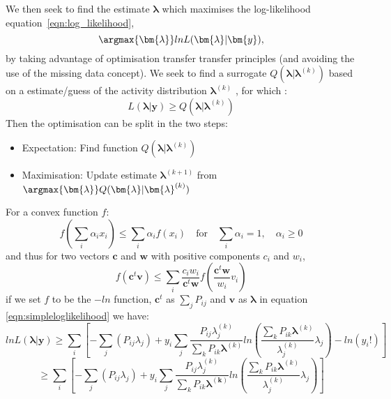 We then seek to find the estimate $\bm{\lambda}$ which maximises the log-likelihood equation~\ref{eqn:log_likelihood},
\begin{equation}
\argmax{\bm{\lambda}}lnL(\bm{\lambda}|\bm{y}) \\, 
\end{equation}
by taking advantage of optimisation transfer transfer principles (and avoiding the use of the missing data concept). We seek to find a surrogate $Q(\bm{\lambda}|\bm{\lambda}^{(k)})$ based on a estimate/guess of the activity distribution $\bm{\lambda}^{(k)}$ , for which : 
\begin{equation}
L(\bm{\lambda}|\bm{y}) \geq Q(\bm{\lambda}|\bm{\lambda}^{(k)}) 
\end{equation}
Then the optimisation can be split in the two steps: 
\begin{itemize}
\item Expectation: Find function $Q(\bm{\lambda}|\bm{\lambda}^{(k)})$ 
\item Maximisation: Update estimate $\bm{\lambda}^{(k+1)}$ from $\argmax{\bm{\lambda}} Q(\bm{\lambda}|\bm{\lambda}^{(k)})$ 
\end{itemize}
For a convex function $f$:
\begin{equation}
f(\sum_i \alpha_i x_i ) \leq \sum_i \alpha_i f(x_i )\quad  \text{for}  \quad \sum_i \alpha_i = 1,\quad  \alpha_i \geq 0
\end{equation}
and thus for two vectors $\bm{c}$ and $\bm{w}$ with positive components $c_i$ and $w_i$, 
\begin{equation}
f(\bm{c}^t \bm{v}) \leq \sum_i \frac{c_iw_i}{\bm{c}^t\bm{w}}f(\frac{\bm{c}^t\bm{w}}{w_i}v_i)
\label{eqn:optimisation_transfer}
\end{equation}
if we set $f$ to be the $-ln$ function, $\bm{c}^t$ as $\sum_j P_{ij} $ and $\bm{v}$ as $\bm{\lambda}$ in equation \ref{eqn:simpleloglikelihood} we have: 
\begin{equation}
    lnL(\bm{\lambda}|\bm{y})  \geq \sum_i \left[  -\sum_j (P_{ij} \lambda_j) + y_i  \sum_j \frac{P_{ij} \lambda^{(k)}_j}{\sum_k P_{ik} \bm{\lambda}^{(k)}} ln(\frac{\sum_k P_{ik} \bm{\lambda}^{(k)}}{\lambda^{(k)}_j} \lambda_j ) - ln({y_i}!) \right]
\end{equation}
\begin{equation}
\geq \sum_i \left[  -\sum_j (P_{ij} \lambda_j) + y_i  \sum_j \frac{P_{ij}\lambda^{(k)}_j}{\sum_k P_{ik} \bm{\lambda^{(k)}}} ln(\frac{\sum_k P_{ik}  \bm{\lambda}^{(k)}}{\lambda^{(k)}_j} \lambda_j )  \right]
\end{equation}
